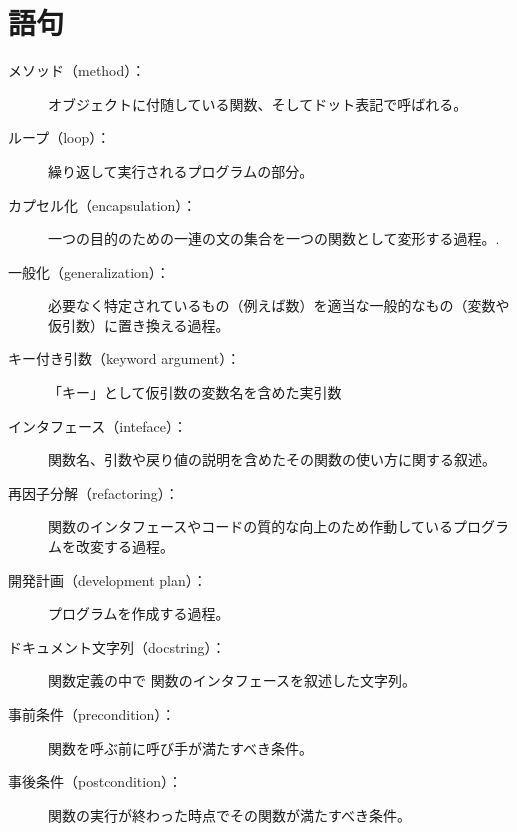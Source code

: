 \documentclass[a4j,12pt,makeidx]{jbook}
\begin{document}
\section{語句}
\begin{description}

\item[メソッド（method）：] オブジェクトに付随している関数、そしてドット表記で呼ばれる。

\item[ループ（loop）：]繰り返して実行されるプログラムの部分。 

\item[カプセル化（encapsulation）：]一つの目的のための一連の文の集合を一つの関数として変形する過程。.

\item[一般化（generalization）：]必要なく特定されているもの（例えば数）を適当な一般的なもの（変数や仮引数）に置き換える過程。

\item[キー付き引数（keyword argument）：]「キー」として仮引数の変数名を含めた実引数

\item[インタフェース（inteface）：] 関数名、引数や戻り値の説明を含めたその関数の使い方に関する叙述。

\item[再因子分解（refactoring）：]関数のインタフェースやコードの質的な向上のため作動しているプログラムを改変する過程。

\item[開発計画（development plan）：]プログラムを作成する過程。

\item[ドキュメント文字列（docstring）：] 関数定義の中で 関数のインタフェースを叙述した文字列。

\item[事前条件（precondition）：] 関数を呼ぶ前に呼び手が満たすべき条件。

\item[事後条件（postcondition）：] 関数の実行が終わった時点でその関数が満たすべき条件。
\end{description}
%
\end{document}
